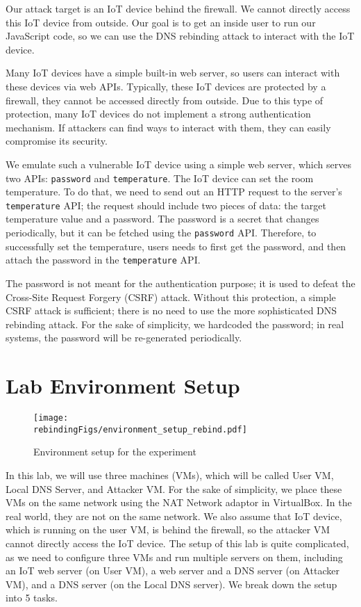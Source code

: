 Our attack target is an IoT device behind the firewall. We cannot directly
access this IoT device from outside. Our goal is to get an inside
user to run our JavaScript code, so we can use
the DNS rebinding attack to interact with the IoT device.


Many IoT devices have a simple built-in web server, so users can
interact with these devices via web APIs. Typically, these IoT
devices are protected by a firewall, they cannot be accessed directly
from outside. Due to this type of protection,  many IoT devices do not
implement a strong authentication mechanism. If attackers can find ways
to interact with them, they can easily compromise its security.

We emulate such a vulnerable IoT device using 
a simple web server, which serves
two APIs: \texttt{password} and \texttt{temperature}.
The IoT device can set the room temperature. To do that,
we need to send out an HTTP request to the server's
\texttt{temperature} API; the request should include
two pieces of data: the target temperature value and a
password.  The password is a secret that changes
periodically, but it can be fetched using
the \texttt{password} API. Therefore, to successfully
set the temperature, users needs to
first get the password, and then attach the password
in the \texttt{temperature} API.

The password is not meant for the authentication purpose; it is used to defeat the Cross-Site
Request Forgery (CSRF) attack. Without this protection, a simple CSRF attack is sufficient;
there is no need to use the more sophisticated DNS rebinding attack.
For the sake of simplicity, we hardcoded the
password; in real systems, the password will be re-generated periodically.




\section{Lab Environment Setup}

\begin{figure}[htb]
\centering
\texttt{[image: \\rebindingFigs/environment\_setup\_rebind.pdf]}
\caption{Environment setup for the experiment}
\label{dns:fig:rebind_environment}
\end{figure}


In this lab, we will use three machines (VMs), which will be called 
User VM, Local DNS Server, and Attacker VM. For the sake of simplicity,
we place these VMs on the same network using the NAT Network adaptor in VirtualBox. In the 
real world, they are not on the same network.
We also assume that IoT device, which is running on the user VM, 
is behind the firewall, so the attacker VM cannot directly
access the IoT device. 
The setup of this lab is quite complicated, as we need to 
configure three VMs and run multiple servers on them, including 
an IoT web server (on User VM), a web server and a DNS server (on Attacker
VM), and a DNS server (on the Local DNS server). 
We break down the setup into 5 tasks. 


